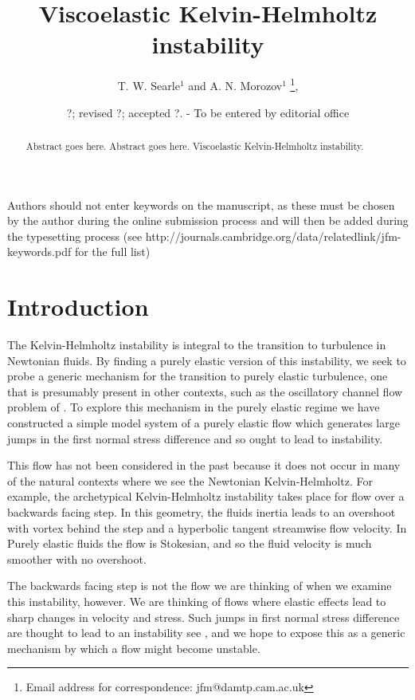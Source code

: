 \documentclass{jfm}
\title[Viscoelastic Kelvin-Helmholtz instabilty]{Viscoelastic Kelvin-Helmholtz instability}
\author[T. W. Searle and A. N. Morozov]%
{T. W. Searle$^1$ and A. N. Morozov$^1$%
  \thanks{Email address for correspondence: jfm@damtp.cam.ac.uk},\ns
}
\affiliation{$^1$SUPA, School of Physics and Astronomy, University of Edinburgh, Mayfield Road,
Edinburgh, EH9 3JZ, UK\\
[\affilskip]
}
\date{?; revised ?; accepted ?. - To be entered by editorial office}
\begin{document}
\maketitle

\begin{abstract}
  Abstract goes here. Abstract goes here. Viscoelastic Kelvin-Helmholtz instability. 
\end{abstract}

\begin{keywords}
Authors should not enter keywords on the manuscript, as these must be chosen by
the author during the online submission process and will then be added during
the typesetting process (see
http://journals.cambridge.org/data/\linebreak[3]relatedlink/jfm-\linebreak[3]keywords.pdf
for the full list)
\end{keywords}

\section{Introduction}

The Kelvin-Helmholtz instability is integral to the transition to turbulence in
Newtonian fluids. By finding a purely elastic version of this instability, we
seek to probe a generic mechanism for the transition to purely elastic
turbulence, one that is presumably present in other contexts, such as the
oscillatory channel flow problem of \cite{Searle2016b}. To explore this
mechanism in the purely elastic regime we have constructed a simple model
system of a purely elastic flow which generates large jumps in the first normal
stress difference and so ought to lead to instability.

This flow has not been considered in the past because it does not occur in many
of the natural contexts where we see the Newtonian Kelvin-Helmholtz. For
example, the archetypical Kelvin-Helmholtz instability takes place for flow
over a backwards facing step. In this geometry, the fluids inertia leads to an
overshoot with vortex behind the step and a hyperbolic tangent streamwise flow
velocity. In Purely elastic fluids the flow is Stokesian, and so the fluid
velocity is much smoother with no overshoot.

The backwards facing step is not the flow we are thinking of when we examine
this instability, however. We are thinking of flows where elastic effects lead
to sharp changes in velocity and stress. Such jumps in first normal stress
difference are thought to lead to an instability see \citet{Morozov2007}, and
we hope to expose this as a generic mechanism by which a flow might become
unstable.
\end{document}
